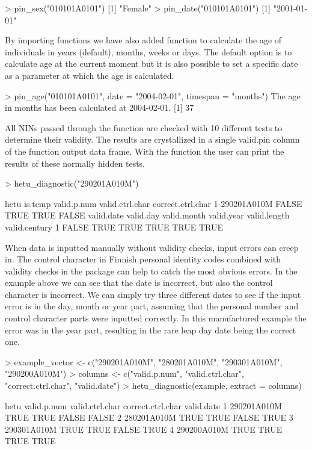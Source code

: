 \begin{example}
  > pin_sex("010101A0101")
  [1] "Female"
  > pin_date("010101A0101")
  [1] "2001-01-01"
\end{example}

By importing  \citep{lubridate} functions we have also added  function to calculate the age of individuals in years (default), months, weeks or days. The default option is to calculate age at the current moment but it is also possible to set a specific date as a parameter at which the age is calculated.

\begin{example}
  > pin_age("010101A0101", date = "2004-02-01", timespan = "months")
  The age in months has been calculated at 2004-02-01.
  [1] 37
\end{example}

All NINs passed through the  function are checked with 10 different tests to determine their validity. The results are crystallized in a single valid.pin column of the  function output data frame. With the  function the user can print the results of these normally hidden tests.

\begin{example}
  > hetu_diagnostic("290201A010M")
  
           hetu is.temp valid.p.num valid.ctrl.char correct.ctrl.char
  1 290201A010M   FALSE        TRUE            TRUE             FALSE
    valid.date valid.day valid.month valid.year valid.length valid.century
  1      FALSE      TRUE        TRUE       TRUE         TRUE          TRUE
\end{example}

When data is inputted manually without validity checks, input errors can creep in. The control character in Finnish personal identity codes combined with validity checks in the  package can help to catch the most obvious errors. In the example above we can see that the date is incorrect, but also the control character is incorrect. We can simply try three different dates to see if the input error is in the day, month or year part, assuming that the personal number and control character parts were inputted correctly. In this manufactured example the error was in the year part, resulting in the rare leap day date being the correct one.

\begin{example}
  > example_vector <- c("290201A010M", "280201A010M", "290301A010M", "290200A010M")
  > columns <- c("valid.p.num", "valid.ctrl.char", "correct.ctrl.char", "valid.date")
  > hetu_diagnostic(example, extract = columns)
  
           hetu valid.p.num valid.ctrl.char correct.ctrl.char valid.date
  1 290201A010M        TRUE            TRUE             FALSE      FALSE
  2 280201A010M        TRUE            TRUE             FALSE       TRUE
  3 290301A010M        TRUE            TRUE             FALSE       TRUE
  4 290200A010M        TRUE            TRUE              TRUE       TRUE
\end{example}

